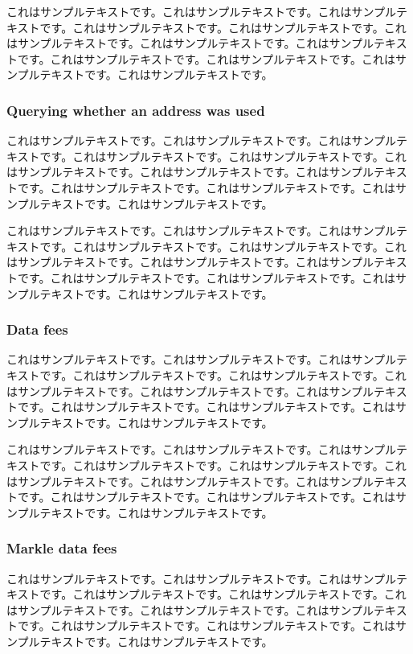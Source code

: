 \documentclass[a4paper, dvipdfmx]{jsarticle}
\begin{document}
これはサンプルテキストです。これはサンプルテキストです。これはサンプルテキストです。これはサンプルテキストです。これはサンプルテキストです。これはサンプルテキストです。これはサンプルテキストです。これはサンプルテキストです。これはサンプルテキストです。これはサンプルテキストです。これはサンプルテキストです。これはサンプルテキストです。

\subsubsection{Querying whether an address was used}
これはサンプルテキストです。これはサンプルテキストです。これはサンプルテキストです。これはサンプルテキストです。これはサンプルテキストです。これはサンプルテキストです。これはサンプルテキストです。これはサンプルテキストです。これはサンプルテキストです。これはサンプルテキストです。これはサンプルテキストです。これはサンプルテキストです。

これはサンプルテキストです。これはサンプルテキストです。これはサンプルテキストです。これはサンプルテキストです。これはサンプルテキストです。これはサンプルテキストです。これはサンプルテキストです。これはサンプルテキストです。これはサンプルテキストです。これはサンプルテキストです。これはサンプルテキストです。これはサンプルテキストです。

\subsubsection{Data fees}
これはサンプルテキストです。これはサンプルテキストです。これはサンプルテキストです。これはサンプルテキストです。これはサンプルテキストです。これはサンプルテキストです。これはサンプルテキストです。これはサンプルテキストです。これはサンプルテキストです。これはサンプルテキストです。これはサンプルテキストです。これはサンプルテキストです。

これはサンプルテキストです。これはサンプルテキストです。これはサンプルテキストです。これはサンプルテキストです。これはサンプルテキストです。これはサンプルテキストです。これはサンプルテキストです。これはサンプルテキストです。これはサンプルテキストです。これはサンプルテキストです。これはサンプルテキストです。これはサンプルテキストです。

\subsubsection{Markle data fees}
これはサンプルテキストです。これはサンプルテキストです。これはサンプルテキストです。これはサンプルテキストです。これはサンプルテキストです。これはサンプルテキストです。これはサンプルテキストです。これはサンプルテキストです。これはサンプルテキストです。これはサンプルテキストです。これはサンプルテキストです。これはサンプルテキストです。
\end{document}
